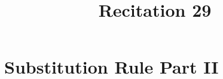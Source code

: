 \documentclass[nooutcomes, handout]{ximera}
\title{Recitation 29}
\renewcommand{\d}{\,d}
\begin{document}
\begin{abstract}		\end{abstract}
\maketitle

\section{Substitution Rule Part II }
	
		
\end{document}
